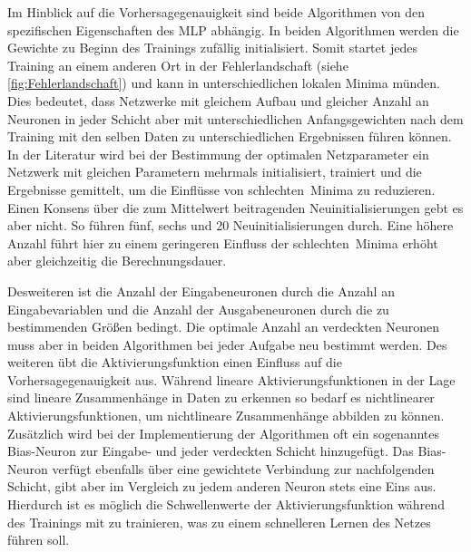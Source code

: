 Im Hinblick auf die Vorhersagegenauigkeit sind beide Algorithmen von den spezifischen Eigenschaften des MLP abhängig. In beiden Algorithmen werden die Gewichte zu Beginn des Trainings zufällig initialisiert. Somit startet jedes Training an einem anderen Ort in der Fehlerlandschaft (siehe \autoref{fig:Fehlerlandschaft}) und kann in unterschiedlichen lokalen Minima münden. Dies bedeutet, dass Netzwerke mit gleichem Aufbau und gleicher Anzahl an Neuronen in jeder Schicht aber mit unterschiedlichen Anfangsgewichten nach dem Training mit den selben Daten zu unterschiedlichen Ergebnissen führen können. In der Literatur wird bei der Bestimmung der optimalen Netzparameter ein Netzwerk mit gleichen Parametern mehrmals initialisiert, trainiert und die Ergebnisse gemittelt, um die Einflüsse von \glqq schlechten\grqq~Minima zu reduzieren. Einen Konsens über die zum Mittelwert beitragenden Neuinitialisierungen gebt es aber nicht. So führen \citet{Domanski2017} fünf, \citet{Keles2016} sechs und \citet{Monteiro2016} 20 Neuinitialisierungen durch. Eine höhere Anzahl führt hier zu einem geringeren Einfluss der \glqq schlechten\grqq~Minima erhöht aber gleichzeitig die Berechnungsdauer.

Desweiteren ist die Anzahl der Eingabeneuronen durch die Anzahl an Eingabevariablen und die Anzahl der Ausgabeneuronen durch die zu bestimmenden Größen bedingt. Die optimale Anzahl an verdeckten Neuronen muss aber in beiden Algorithmen bei jeder Aufgabe neu bestimmt werden. Des weiteren übt die Aktivierungsfunktion einen Einfluss auf die Vorhersagegenauigkeit aus. Während lineare Aktivierungsfunktionen in der Lage sind lineare Zusammenhänge in Daten zu erkennen so bedarf es nichtlinearer Aktivierungsfunktionen, um nichtlineare Zusammenhänge abbilden zu können.\, Zusätzlich wird bei der Implementierung der Algorithmen oft ein sogenanntes Bias-Neuron zur Eingabe- und jeder verdeckten Schicht hinzugefügt. Das Bias-Neuron verfügt ebenfalls über eine gewichtete Verbindung zur nachfolgenden Schicht, gibt aber im Vergleich zu jedem anderen Neuron stets eine Eins aus. Hierdurch ist es möglich die Schwellenwerte der Aktivierungsfunktion während des Trainings mit zu trainieren, was zu einem schnelleren Lernen des Netzes führen soll.\,